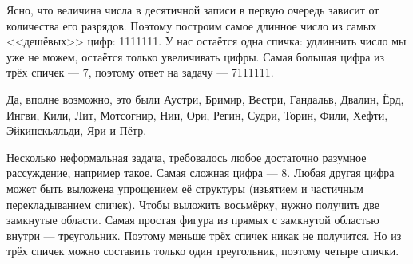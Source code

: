 \begin{itemize}
\itA Ясно, что величина числа в десятичной записи в первую очередь зависит от 
количества его разрядов. Поэтому построим самое длинное число из самых
<<дешёвых>> цифр: 1111111. У нас остаётся одна спичка: удлиннить число мы
уже не можем, остаётся только увеличивать цифры. Самая большая цифра из трёх
спичек --- 7, поэтому ответ на задачу --- 7111111.

\itB Да, вполне возможно, это были 
Аустри, Бримир, Вестри, Гандальв, Двалин, 
Ёрд, Ингви, Кили, Лит, Мотсогнир, 
Нии, Ори, Регин, Судри, Торин,
Фили, Хефти, Эйкинскьяльди, Яри
и Пётр.
                                                        
\itC Несколько неформальная задача, требовалось любое достаточно разумное 
рассуждение, например такое.
Самая сложная цифра --- 8. Любая другая цифра может быть выложена
упрощением её структуры (изъятием и частичным перекладыванием спичек).
Чтобы выложить восьмёрку, нужно получить две замкнутые области.
Самая простая фигура из прямых с замкнутой областью внутри --- треугольник.
Поэтому меньше трёх спичек никак не получится. Но из трёх спичек 
можно составить только один треугольник, поэтому четыре спички.

\begin{center} \end{center}

\end{itemize}
